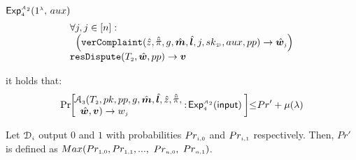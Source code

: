 \begin{definition}[Privacy]
\begin{enumerate}[leftmargin=*]
\begin{center}
{{\begin{mybox}[colback=white,  width=78mm, height=65mm, left=-1mm, drop fuzzy shadow southwest]{$\mathsf{Exp}_{\scriptscriptstyle 4}^{\scriptscriptstyle\mathcal{A}_{\scriptscriptstyle 2}}(1^{\scriptscriptstyle\lambda}\text{, }  {aux})$}
$$\begin{array}{l}
%
 \forall j, j\in [n]:\\
\hsp\Big(\mathtt{verComplaint}( \hat z, \hat{\ddot{\pi}}, g, \hat{\bm m}, \hat{\bm{l}}, j, sk_{\st\mathcal D}, aux, pp)\rightarrow \hat{\bm{w}}_{\st j}
\Big)
 \\
\mathtt{resDispute}(T_{\st 2}, \hat {\bm w}, pp)\rightarrow \bm v
\\
%
%
   \end{array} 
$$
\end{mybox}
}}
\end{center}


it holds that:
%
{\small{
$$ \Pr \hspace{-.8mm}\left[
  \begin{array}{l}
%
\hspace{-2.1mm}\mathcal{A}_{\st 3}(T_{\st 2}, pk, pp, g, \hat{\bm m}, \hat{\bm l},  \hat z, \hat{\ddot \pi},\\ \hat{\bm{w}}, \bm v)\rightarrow w_{\st j}
\end{array}\hspace{-1.9mm} :\lhs
    \begin{array}{l}
 \hspace{-.8mm}  \mathsf{Exp}_{\st 4}^{\st\mathcal{A}_{\st 2}}(\mathsf{input})\\
\end{array}  \hs  \right]\hspace{-1mm} \leq\hspace{-.8mm}  {Pr}'+\mu(\lambda)$$
}}

Let $\mathcal{D}_{\scriptscriptstyle i}$ output $0$ and $1$ with probabilities $Pr_{\scriptscriptstyle i,0}$ and $Pr_{\scriptscriptstyle i,1}$ respectively. Then, $Pr'$ is defined as  $Max(Pr_{\scriptscriptstyle 1,0},Pr_{\scriptscriptstyle 1,1}, ...,$ $ Pr_{\scriptscriptstyle n,0}, $ $Pr_{\scriptscriptstyle n,1} )$. %


\end{enumerate}
\end{definition}
